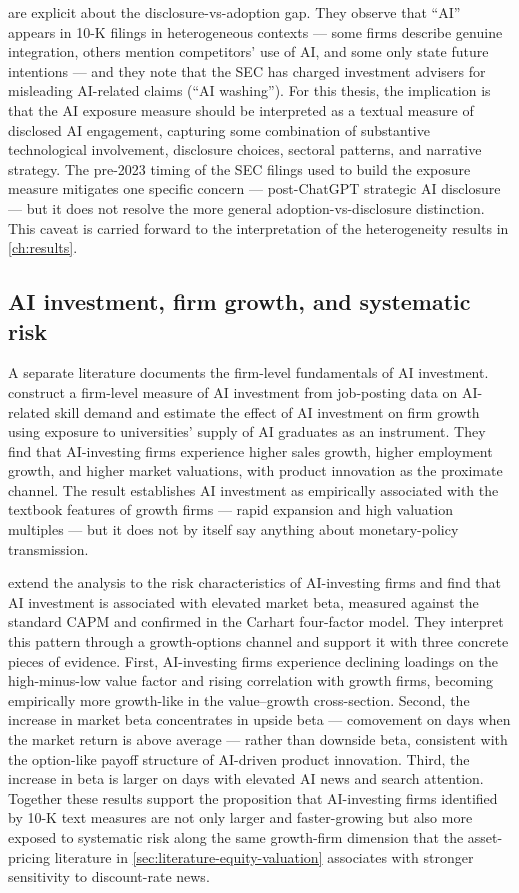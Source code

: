  are explicit about the disclosure-vs-adoption
gap. They observe that ``AI'' appears in 10-K filings in heterogeneous
contexts --- some firms describe genuine integration, others mention
competitors' use of AI, and some only state future intentions --- and
they note that the SEC has charged investment advisers for misleading
AI-related claims (``AI washing''). For this thesis, the implication
is that the AI exposure measure should be interpreted as a textual
measure of disclosed AI engagement, capturing some combination of
substantive technological involvement, disclosure choices, sectoral
patterns, and narrative strategy. The pre-2023 timing of the SEC
filings used to build the exposure measure mitigates one specific
concern --- post-ChatGPT strategic AI disclosure --- but it does not
resolve the more general adoption-vs-disclosure distinction. This
caveat is carried forward to the interpretation of the heterogeneity
results in \cref{ch:results}.

\subsection*{AI investment, firm growth, and systematic risk}

A separate literature documents the firm-level fundamentals of AI
investment.  construct a firm-level measure of
AI investment from job-posting data on AI-related skill demand and
estimate the effect of AI investment on firm growth using exposure to
universities' supply of AI graduates as an instrument. They find that
AI-investing firms experience higher sales growth, higher employment
growth, and higher market valuations, with product innovation as the
proximate channel. The result establishes AI investment as
empirically associated with the textbook features of growth firms ---
rapid expansion and high valuation multiples --- but it does not by
itself say anything about monetary-policy transmission.

 extend the analysis to the risk
characteristics of AI-investing firms and find that AI investment
is associated with elevated market beta, measured against the
standard CAPM and confirmed in the Carhart four-factor model.
They interpret this pattern through a growth-options channel and
support it with three concrete pieces of evidence. First,
AI-investing firms experience declining loadings on the
high-minus-low value factor and rising correlation with growth
firms, becoming empirically more growth-like in the value--growth
cross-section. Second, the increase in market beta concentrates
in upside beta --- comovement on days when the market return is
above average --- rather than downside beta, consistent with the
option-like payoff structure of AI-driven product innovation.
Third, the increase in beta is larger on days with elevated AI
news and search attention. Together these results support the
proposition that AI-investing firms identified by 10-K text
measures are not only larger and faster-growing but also more
exposed to systematic risk along the same growth-firm dimension
that the asset-pricing literature in
\cref{sec:literature-equity-valuation} associates with stronger
sensitivity to discount-rate news.

